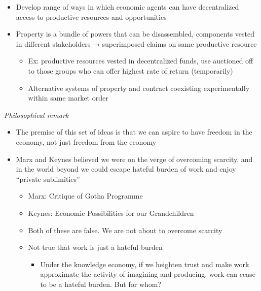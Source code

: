 \begin{itemize}
\begin{enumerate}
    \begin{itemize}
    \tightlist
    \item
      Develop range of ways in which economic agents can have
      decentralized access to productive resources and opportunities
    \item
      Property is a bundle of powers that can be disassembled,
      components vested in different stakeholders → superimposed claims
      on same productive resource

      \begin{itemize}
      \tightlist
      \item
        Ex: productive resources vested in decentralized funds, use
        auctioned off to those groups who can offer highest rate of
        return (temporarily)
      \item
        Alternative systems of property and contract coexisting
        experimentally within same market order
      \end{itemize}
    \end{itemize}
  \end{enumerate}
\end{itemize}

\emph{Philosophical remark}

\begin{itemize}
\tightlist
\item
  The premise of this set of ideas is that we can aspire to have freedom
  in the economy, not just freedom from the economy
\item
  Marx and Keynes believed we were on the verge of overcoming scarcity,
  and in the world beyond we could escape hateful burden of work and
  enjoy ``private sublimities''

  \begin{itemize}
  \tightlist
  \item
    Marx: Critique of Gotha Programme
  \item
    Keynes: Economic Possibilities for our Grandchildren
  \item
    Both of these are false. We are not about to overcome scarcity
  \item
    Not true that work is just a hateful burden

    \begin{itemize}
    \tightlist
    \item
      Under the knowledge economy, if we heighten trust and make work
      approximate the activity of imagining and producing, work can
      cease to be a hateful burden. But for whom?
    \end{itemize}
  \end{itemize}
\end{itemize}

